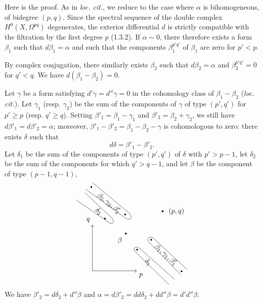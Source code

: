 \documentclass[10pt]{article}
\begin{document}
Here is the proof. As in \textit{loc. cit.}, we reduce to the case where $\alpha$ is bihomogeneous, of bidegree $(p,q)$. Since the spectral sequence of the double complex $H^0(X,\Omega^{pq})$ degenerates, the exterior differential $d$ is strictly compatible with the filtration by the first degree $p$ (1.3.2). If $\alpha\sim0$, there therefore exists a form $\beta_1$ such that $d\beta_1=\alpha$ and such that the components $\beta_1^{p'q'}$ of $\beta_1$ are zero for $p'<p$.

By complex conjugation, there similarly exists $\beta_2$ such that $d\beta_2=\alpha$ and $\beta_2^{p'q'}=0$ for $q'<q$. We have $d(\beta_1-\beta_2)=0$.

Let $\gamma$ be a form satisfying $d'\gamma=d''\gamma=0$ in the cohomology class of $\beta_1-\beta_2$ (\textit{loc. cit.}). Let $\gamma_1$ (resp. $\gamma_2$) be the sum of the components of $\gamma$ of type $(p',q')$ for $p'\ge p$ (resp. $q'\ge q$). Setting $\beta'_1=\beta_1-\gamma_1$ and $\beta'_2=\beta_2+\gamma_2$, we still have $d\beta'_1=d\beta'_2=\alpha$; moreover, $\beta'_1-\beta'_2=\beta_1-\beta_2-\gamma$ is cohomologous to zero: there exists $\delta$ such that
\[
d\delta=\beta'_1-\beta'_2.
\]
Let $\delta_1$ be the sum of the components of type $(p',q')$ of $\delta$ with  $p'>p-1$, let $\delta_2$ be the sum of the components for which $q'>q-1$, and let $\beta$ be the component of type $(p-1,q-1)$,
\[
\begin{tikzpicture}[x=.68cm,y=.68cm,baseline=(current bounding box.center),line cap=round,line join=round]
\draw[->] (0,0)--(3.25,0) node[below right] {$p$};
\draw[->] (0,0)--(0,3.35) node[above left] {$q$};
\fill (2.45,2.72) circle (1.3pt) node[below left=2pt] {$\beta$};
\fill (5.15,4.35) circle (1.3pt) node[right=5pt] {$(p,q)$};
\draw (-1.15,5.15)--(1.18,3.55)
  .. controls (1.48,3.34) and (1.68,3.55) .. (1.42,3.87)--(-.55,5.70);
\fill (.92,3.82) circle (1.2pt);
\node[rotate=-39] at (.45,4.35) {$\delta_2$};
\draw (-.48,5.95)--(2.42,3.86)
  .. controls (2.76,3.61) and (3.02,3.86) .. (2.70,4.22)--(.02,6.42);
\fill (-.08,6.12) circle (1.2pt);
\fill (2.40,4.12) circle (1.2pt);
\node[rotate=-39] at (1.20,4.94) {$\beta_2,\gamma_2,\beta'_2$};
\draw (5.62,-1.00)--(3.20,1.34)
  .. controls (2.91,1.62) and (3.14,1.88) .. (3.48,1.63)--(6.03,-.62);
\fill (3.28,1.55) circle (1.2pt);
\node[rotate=-43] at (4.08,.62) {$\delta_1$};
\draw (6.48,-.28)--(4.20,2.04)
  .. controls (3.90,2.35) and (4.17,2.62) .. (4.53,2.34)--(6.93,.12);
\fill (4.31,2.27) circle (1.2pt);
\fill (6.54,-.03) circle (1.2pt);
\node[rotate=-42] at (5.38,1.17) {$\beta_1,\gamma_1,\beta'_1$};
\end{tikzpicture}
\]
We have $\beta'_2=d\delta_2+d''\beta$ and $\alpha=d\beta'_2=dd\delta_2+dd''\beta=d'd''\beta$.
\end{document}
